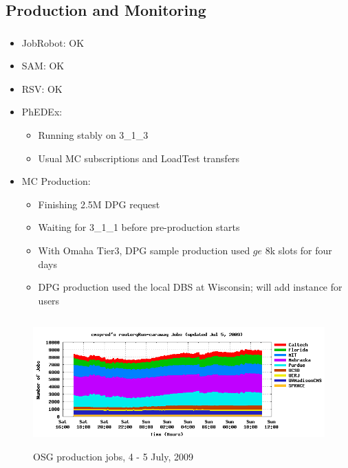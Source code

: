 \documentclass{beamer}
\begin{document}
\subsection{Production and Monitoring}
\begin{frame}
\frametitle{}
\begin{itemize}
	\item JobRobot: OK
	\item SAM: OK
	\item RSV: OK
	\item PhEDEx:
	\begin{itemize}
		\item Running stably on 3\_1\_3
		\item Usual MC subscriptions and LoadTest transfers
	\end{itemize}
	\item MC Production:
	\begin{itemize}
		\item Finishing 2.5M DPG request
		\item Waiting for 3\_1\_1 before pre-production starts
		\item With Omaha Tier3, DPG sample production used $ge$ 8k slots for four days
		\item DPG production used the local DBS at Wisconsin; will add instance for users
	\end{itemize}
\end{itemize}
\end{frame}

\begin{frame}
    \begin{figure}
    \includegraphics[height=5cm]{Graphics/routerqRun-caraway-Jul5.png}
    \caption{OSG production jobs, 4 - 5 July, 2009}
    \end{figure}
\end{frame}
\end{document}
